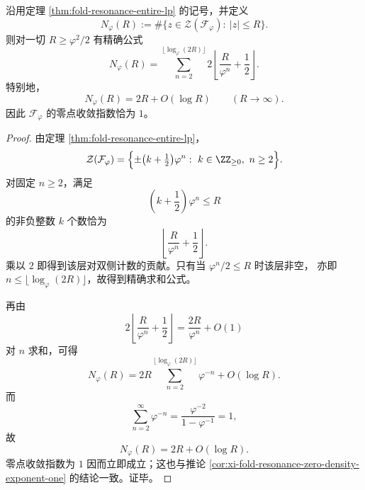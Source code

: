 \begin{corollary}[共振整函数双侧零点计数的显式求和与线性密度]\label{cor:xi-resonance-entire-zero-count-explicit-linear-density}
沿用定理 \ref{thm:fold-resonance-entire-lp} 的记号，并定义
\[
N_\varphi(R):=\#\{z\in \mathcal Z(\mathcal F_\varphi):\ |z|\le R\}.
\]
则对一切 \(R\ge \varphi^2/2\) 有精确公式
\[
\boxed{\;
N_\varphi(R)=
\sum_{n=2}^{\lfloor \log_\varphi(2R)\rfloor}
2\left\lfloor \frac{R}{\varphi^n}+\frac12\right\rfloor.\;}
\]
特别地，
\[
\boxed{\;
N_\varphi(R)=2R+O(\log R)
\qquad (R\to\infty).\;}
\]
因此 \(\mathcal F_\varphi\) 的零点收敛指数恰为 \(1\)。
\end{corollary}
\begin{proof}
由定理 \ref{thm:fold-resonance-entire-lp}，
\[
\mathcal Z(\mathcal F_\varphi)
=
\Bigl\{\pm\bigl(k+\tfrac12\bigr)\varphi^n:\ k\in\ZZ_{\ge 0},\ n\ge 2\Bigr\}.
\]
对固定 \(n\ge 2\)，满足
\[
\left(k+\frac12\right)\varphi^n\le R
\]
的非负整数 \(k\) 个数恰为
\[
\left\lfloor \frac{R}{\varphi^n}+\frac12\right\rfloor.
\]
乘以 \(2\) 即得到该层对双侧计数的贡献。只有当 \(\varphi^n/2\le R\) 时该层非空，
亦即 \(n\le \lfloor\log_\varphi(2R)\rfloor\)，故得到精确求和公式。

再由
\[
2\left\lfloor \frac{R}{\varphi^n}+\frac12\right\rfloor
=
\frac{2R}{\varphi^n}+O(1)
\]
对 \(n\) 求和，可得
\[
N_\varphi(R)
=
2R\sum_{n=2}^{\lfloor \log_\varphi(2R)\rfloor}\varphi^{-n}
+O(\log R).
\]
而
\[
\sum_{n=2}^{\infty}\varphi^{-n}
=
\frac{\varphi^{-2}}{1-\varphi^{-1}}
=
1,
\]
故
\[
N_\varphi(R)=2R+O(\log R).
\]
零点收敛指数为 \(1\) 因而立即成立；这也与推论
\ref{cor:xi-fold-resonance-zero-density-exponent-one} 的结论一致。证毕。
\end{proof}
